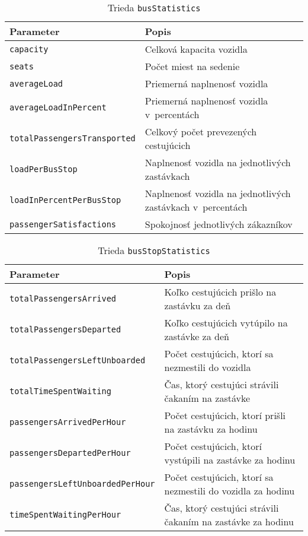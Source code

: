 \begin{table}[h]\label{tab:busStatistics_class}
  \centering
  \begin{tabularx}{\textwidth}{|l|X|}
    \hline
    \textbf{Parameter} & \textbf{Popis} \\ \hline
    \texttt{capacity} & Celková kapacita vozidla \\ \hline
    \texttt{seats} & Počet miest na sedenie \\ \hline
    \texttt{averageLoad} & Priemerná naplnenosť vozidla \\ \hline
    \texttt{averageLoadInPercent} & Priemerná naplnenosť vozidla v~percentách \\ \hline
    \texttt{totalPassengersTransported} & Celkový počet prevezených cestujúcich \\ \hline
    \texttt{loadPerBusStop} & Naplnenosť vozidla na jednotlivých zastávkach \\ \hline
    \texttt{loadInPercentPerBusStop} & Naplnenosť vozidla na jednotlivých zastávkach v~percentách \\ \hline
    \texttt{passengerSatisfactions} & Spokojnosť jednotlivých zákazníkov \\ \hline
  \end{tabularx}
  \caption{Trieda \texttt{busStatistics}}
\end{table}

\begin{table}[h]\label{tab:busStopStatistics_class}
  \centering
  \begin{tabularx}{\textwidth}{|l|X|}
    \hline
    \textbf{Parameter} & \textbf{Popis} \\ \hline
    \texttt{totalPassengersArrived} & Koľko cestujúcich prišlo na zastávku za deň \\ \hline
    \texttt{totalPassengersDeparted} & Koľko cestujúcich vytúpilo na zastávke za deň \\ \hline
    \texttt{totalPassengersLeftUnboarded} & Počet cestujúcich, ktorí sa nezmestili do vozidla \\ \hline
    \texttt{totalTimeSpentWaiting} & Čas, ktorý cestujúci strávili čakaním na zastávke \\ \hline
    \texttt{passengersArrivedPerHour} & Počet cestujúcich, ktorí prišli na zastávku za hodinu \\ \hline
    \texttt{passengersDepartedPerHour} & Počet cestujúcich, ktorí vystúpili na zastávke za hodinu \\ \hline
    \texttt{passengersLeftUnboardedPerHour} & Počet cestujúcich, ktorí sa nezmestili do vozidla za hodinu \\ \hline
    \texttt{timeSpentWaitingPerHour} & Čas, ktorý cestujúci strávili čakaním na zastávke za hodinu \\ \hline
  \end{tabularx}
  \caption{Trieda \texttt{busStopStatistics}}
\end{table}

